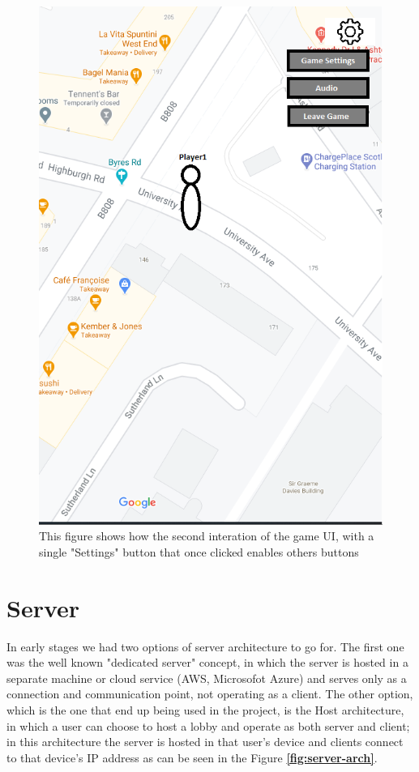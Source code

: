 \documentclass{dissertation}
\begin{document}
\begin{figure}[H]
\centering
\includegraphics[width = .6\linewidth]{images/game-ui2.png}
\caption{This figure shows how the second interation of the game UI, with a single "Settings" button that once clicked enables others buttons}
\label{fig:game-ui2}
\end{figure}

\section{Server} 

In early stages we had two options of server architecture to go for. The first one was the well known "dedicated server" concept, in which the server is hosted in a separate machine or cloud service (AWS, Microsofot Azure) and serves only as a connection and communication point, not operating as a client. The other option, which is the one that end up being used in the project, is the Host architecture, in which a user can choose to host a lobby and operate as both server and client; in this architecture the server is hosted in that user's device and clients connect to that device's IP address as can be seen in the Figure \textbf{\ref{fig:server-arch}}.
\end{document}
